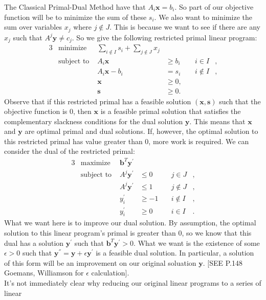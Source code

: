 \documentclass[11pt]{article}
\renewcommand{\'}{^{'}}
\begin{document}
\begin{section}{The Classical Primal-Dual Method}
	have that $A_i\mathbf{x} = b_i$. So part of our objective function will be to minimize the 
	sum of these $s_i$. We also want to minimize the sum over variables $x_j$ where $j\notin J$. 
	This is because we want to see if there are any $x_j$ such that $A^{j}\mathbf{y} \neq c_j$. 
	So we give the following restricted primal linear program:
	\begin{alignat}{3}
		& \text{minimize } & \sum_{i\notin I} s_i + \sum_{j\notin J} x_j & \\
		& \text{subject to } & A_i\mathbf{x} & \geq b_i & \quad i\in I &, \\
				     && A_i\mathbf{x} - b_i & = s_i & \quad i\notin I &, \\
				     && \mathbf{x} & \geq 0, \\
				     && \mathbf{s} & \geq 0.
	\end{alignat}
	Observe that if this restricted primal has a feasible solution $(\mathbf{x},\mathbf{s})$ such 
	that the objective function is 0, then $\mathbf{x}$ is a feasible primal solution that 
	satisfies the complementary slackness conditions for the dual solution $\mathbf{y}$. This 
	means that $\mathbf{x}$ and $\mathbf{y}$ are optimal primal and dual solutions. If, however, 
	the optimal solution to this restricted primal has value greater than 0, more work is required. 
	We can consider the dual of the restricted primal:
	\begin{alignat}{3}
		& \text{maximize } & \mathbf{b}^{T}\mathbf{y}\' & \\
		& \text{subject to } & A^{j}\mathbf{y}\' & \leq 0 & \quad j\in J &, \\
				     && A^{j}\mathbf{y}\' & \leq 1 & \quad j\notin J &, \\
				     && y_i\' & \geq -1 & \quad i\notin I &, \\
				     && y_i\' & \geq 0 & \quad i\in I &.
	\end{alignat}
	What we want here is to improve our dual solution. By assumption, the optimal solution to this 
	linear program's primal is greater than 0, so we know that this dual has a solution 
	$\mathbf{y}\'$ such that $\mathbf{b}^{T}\mathbf{y}\' > 0$. What we want is the existence of 
	some $\epsilon > 0$ such that $\mathbf{y}^{''} = \mathbf{y} + \epsilon \mathbf{y}\'$ is a 
	feasible dual solution. In particular, a solution of this form will be an improvement on our 
	original soluation $\mathbf{y}$. [SEE P.148 Goemans, Williamson for $\epsilon$ calculation].\\
	It's not immediately clear why reducing our original linear programs to a series of linear 

\end{section}
\end{document}
